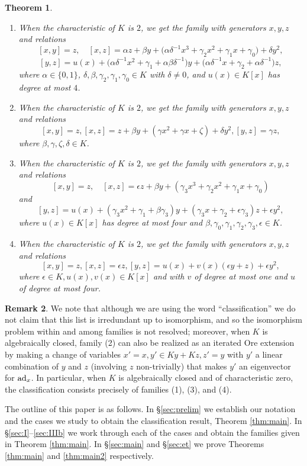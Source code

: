 \documentclass[a4paper,11pt,twoside,notitlepage,reqno]{amsart}
\theoremstyle{plain}
\newtheorem{thm}{Theorem}
\numberwithin{thm}{section}
\theoremstyle{definition}
\newtheorem{remark}[thm]{Remark}
\begin{document}
\begin{thm}
\begin{enumerate}
 \item When the characteristic of $K$ is $2$, we get the family with generators $x,y,z$ and relations
$$[x,y]=z, \quad [x,z]= \alpha z + \beta y + \big(\alpha\delta^{-1} x^3+\gamma_2 x^2 + \gamma_1 x + \gamma_0\big) +\delta y^2,$$
$$[y,z]=u(x)+\big(\alpha\delta^{-1} x^2+\gamma_1+\alpha\beta\delta^{-1}\big)y +\big(\alpha\delta^{-1} x+\gamma_2+\alpha\delta^{-1}\big)z,$$
where $\alpha\in\{0,1\}$, $\delta,\beta,\gamma_2,\gamma_1,\gamma_0\in K$ with $\delta\neq 0$, and $u(x)\in K[x]$ has degree at most $4$. 

\item When the characteristic of $K$ is $2$, we get the family with generators $x,y,z$ and relations
$$[x,y]=z, [x,z]=  z + \beta y + ( \gamma x^2 + \gamma x + \zeta ) +\delta y^2,  [y,z]= \gamma z,$$ where $\beta, \gamma, \zeta, \delta\in K$.
\item When the characteristic of $K$ is $2$, we get the family with generators $x,y,z$ and relations
$$[x,y]=z,\quad [x,z]=  \epsilon z +\beta y + (\gamma_3 x^3+ \gamma_2 x^2 + \gamma_1 x + \gamma_0 )$$
and $$[y,z] = u(x)+(\gamma_3 x^2+\gamma_1+\beta\gamma_3)y+(\gamma_3 x+\gamma_2+\epsilon\gamma_3)z+\epsilon y^2,$$
where $u(x)\in K[x]$ has degree at most four and $\beta,\gamma_0,\gamma_1,\gamma_2,\gamma_3,\epsilon\in K$.

\item When the characteristic of $K$ is $2$, we get the family with generators $x,y,z$ and relations
$$[x,y]=z, [x,z]=\epsilon z, [y,z]= u(x)+v(x)(\epsilon y+z)+\epsilon y^2,$$
where $\epsilon\in K, u(x),v(x)\in K[x]$ and with $v$ of degree at most one and $u$ of degree at most four.
\end{enumerate} 
\end{thm}
\begin{remark}
We note that although we are using the word ``classification'' we do not claim that this list is irredundant up to isomorphism, and so the isomorphism problem within and among families is not resolved; moreover, when $K$ is algebraically closed, family (2) can also be realized as an iterated Ore extension by making a change of variables $x'=x, y'\in Ky+Kz, z'=y$ with $y'$ a linear combination of $y$ and $z$ (involving $z$ non-trivially) that makes $y'$ an eigenvector for ${\rm ad}_x$.  In particular, when $K$ is algebraically closed and of characteristic zero, the classification consists precisely of families (1), (3), and (4).
\end{remark}

The outline of this paper is as follows. In \S \ref{sec:prelim} we establish our notation and the cases we study to obtain the classification result, Theorem \ref{thm:main}. In \S\ref{sec:I}--\ref{sec:IIIb} we work through each of the cases and obtain the families given in Theorem \ref{thm:main}. In \S\ref{sec:main} and \S\ref{sec:et} we prove Theorems \ref{thm:main} and \ref{thm:main2} respectively.
\end{document}
